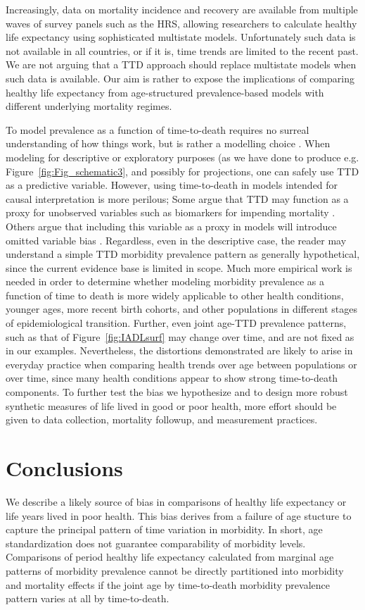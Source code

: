 \documentclass[11pt,oneside,a4paper]{article} %
\begin{document}
Increasingly, data on mortality incidence and recovery are available from
multiple waves of survey panels such as the HRS, allowing researchers to
calculate healthy life expectancy using sophisticated multistate models.
Unfortunately such data is not available in all countries, or if it is, time
trends are limited to the recent past. We are not arguing that a TTD approach
should replace multistate models when such data is available. Our aim is rather
to expose the implications of comparing healthy life expectancy from
age-structured prevalence-based models with different underlying mortality
regimes.

To model prevalence as a function of
time-to-death requires no surreal understanding of how things work, but is
rather a modelling choice \citep{wolf2015disability}. When modeling for
descriptive or exploratory purposes (as we have done to produce e.g. Figure~\ref{fig:Fig_schematic3},
and possibly for projections, one can safely use
TTD as a predictive variable.
However, using time-to-death in models intended for causal interpretation is more perilous; Some argue that TTD may function as a proxy for unobserved variables such as biomarkers for impending mortality \citep{wolf2015disability}. Others argue that including this variable as a proxy in models will introduce omitted variable bias \citep{lynch2015commentary}. Regardless, even in the descriptive case, the reader may understand a simple TTD morbidity prevalence pattern as generally hypothetical, since the current evidence base is limited in scope. Much more empirical work is needed in order to determine whether modeling morbidity
prevalence as a function of time to death is more widely applicable to
other health conditions, younger ages, more recent birth
cohorts, and other populations in different stages of epidemiological
transition. Further, even joint age-TTD prevalence patterns, such as that of Figure~\ref{fig:IADLsurf} may change over time, and are not fixed as in our examples. Nevertheless, the distortions demonstrated are likely to arise in everyday practice when comparing health trends over age between populations or over time, since many health conditions appear to show strong time-to-death components. To further test the bias we hypothesize and to design more robust synthetic measures of life lived in good or poor health, more effort should be given to data collection, mortality followup, and measurement practices.

\section{Conclusions}
We describe a likely source of bias in comparisons of healthy life expectancy or life years lived in poor health. This bias derives from a failure of age stucture to capture the principal pattern of time variation in morbidity. In short, age standardization does not guarantee comparability of morbidity levels. Comparisons of period healthy life expectancy calculated from marginal age patterns of morbidity prevalence cannot be directly partitioned into morbidity and mortality effects if the joint age by time-to-death morbidity prevalence pattern varies at all by time-to-death. 
\end{document}
